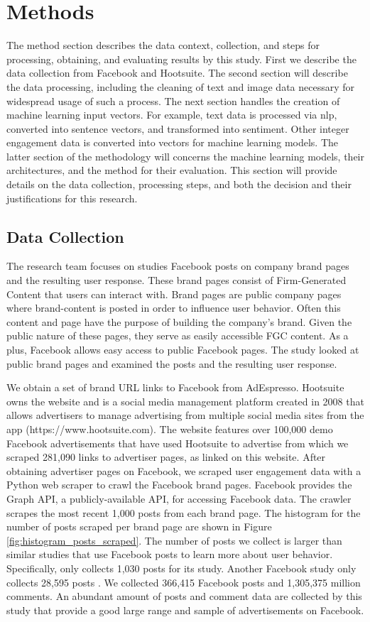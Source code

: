 \documentclass[mksc,blindrev]{informs3} %
\begin{document}
\section{Methods}
The method section describes the data context, collection, and steps for processing, obtaining, and evaluating results by this study. First we describe the data collection from Facebook and Hootsuite. The second section will describe the data processing, including the cleaning of text and image data necessary for widespread usage of such a process. The next section handles the creation of machine learning input vectors. For example, text data is processed via nlp, converted into sentence vectors, and transformed into sentiment. Other integer engagement data is converted into vectors for machine learning models. The latter section of the methodology will concerns the machine learning models, their architectures, and the method for their evaluation. This section will provide details on the data collection, processing steps, and both the decision and their justifications for this research.

\subsection{Data Collection}
The research team focuses on studies Facebook posts on company brand pages and the resulting user response. These brand pages consist of Firm-Generated Content that users can interact with. Brand pages are public company pages where brand-content is posted in order to influence user behavior. Often this content and page have the purpose of building the company's brand. Given the public nature of these pages, they serve as easily accessible FGC content. As a plus, Facebook allows easy access to public Facebook pages. The study looked at public brand pages and examined the posts and the resulting user response.

We obtain a set of brand URL links to Facebook from AdEspresso. Hootsuite owns the website and is a social media management platform created in 2008 that allows advertisers to manage advertising from multiple social media sites from the app  (https://www.hootsuite.com). The website features over 100,000 demo Facebook advertisements that have used Hootsuite to advertise from which we scraped 281,090 links to advertiser pages, as linked on this website. After obtaining advertiser pages on Facebook, we scraped user engagement data with a Python web scraper to crawl the Facebook brand pages. Facebook provides the Graph API, a publicly-available API, for accessing Facebook data. The crawler scrapes the most recent 1,000 posts from each brand page. The histogram for the number of posts scraped per brand page are shown in Figure \ref{fig:histogram_posts_scraped}. The number of posts we collect is larger than similar studies that use Facebook posts to learn more about user behavior. Specifically, \cite{Luarn2015} only collects 1,030 posts for its study. Another Facebook study only collects 28,595 posts \cite{Settanni2015SharingFO}. We collected 366,415 Facebook posts and 1,305,375 million comments. An abundant amount of posts and comment data are collected by this study that provide a good large range and sample of advertisements on Facebook.
\end{document}
